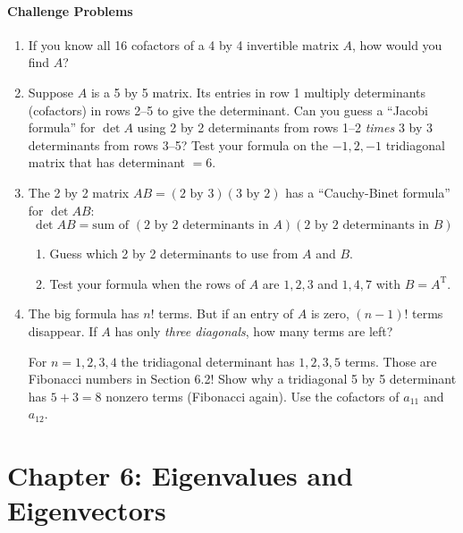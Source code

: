 \documentclass[14pt, a4paper]{article}
\begin{document}
\paragraph{Challenge Problems}
\begin{enumerate}[resume]
    \item If you know all 16 cofactors of a 4 by 4 invertible matrix $A$, how would you find $A$?

    \item Suppose $A$ is a 5 by 5 matrix. Its entries in row 1 multiply determinants (cofactors) in rows 2--5 to give the determinant. Can you guess a ``Jacobi formula'' for $\det A$ using 2 by 2 determinants from rows 1--2 \textit{times} 3 by 3 determinants from rows 3--5? Test your formula on the $-1, 2, -1$ tridiagonal matrix that has determinant $= 6$.

    \item The 2 by 2 matrix $AB = (\text{2 by 3})(\text{3 by 2})$ has a ``Cauchy-Binet formula'' for $\det AB$:
          \[
              \det AB = \text{sum of } (\text{2 by 2 determinants in } A)(\text{2 by 2 determinants in } B)
          \]
          \begin{enumerate}
              \item Guess which 2 by 2 determinants to use from $A$ and $B$.
              \item Test your formula when the rows of $A$ are $1, 2, 3$ and $1, 4, 7$ with $B = A^{\text{T}}$.
          \end{enumerate}

    \item The big formula has $n!$ terms. But if an entry of $A$ is zero, $(n - 1)!$ terms disappear. If $A$ has only \textit{three diagonals}, how many terms are left?

          For $n = 1, 2, 3, 4$ the tridiagonal determinant has $1, 2, 3, 5$ terms. Those are Fibonacci numbers in Section 6.2! Show why a tridiagonal 5 by 5 determinant has $5 + 3 = 8$ nonzero terms (Fibonacci again). Use the cofactors of $a_{11}$ and $a_{12}$.
\end{enumerate}
\newpage

\section{Chapter 6: Eigenvalues and Eigenvectors}
\end{document}
